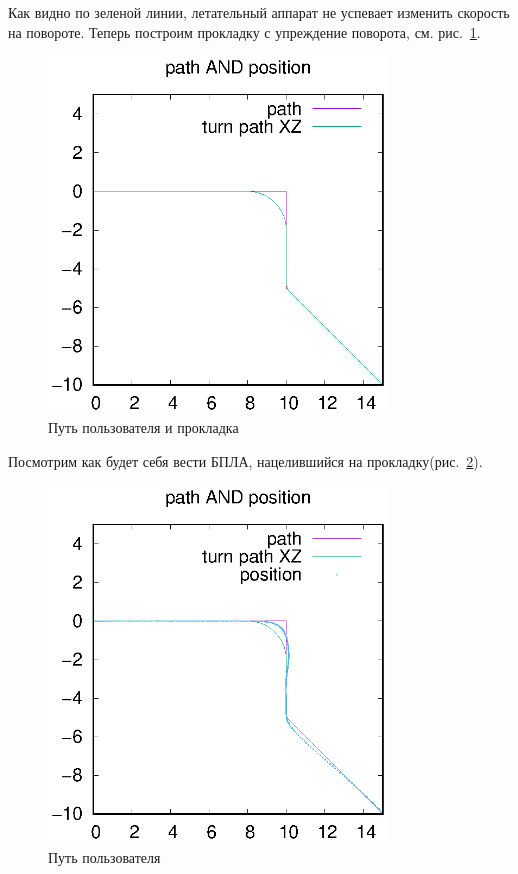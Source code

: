 \documentclass[a4paper,12pt]{article}
\newcounter{def}
\numberwithin{figure}{subsubsection}
\begin{document}
Как видно по зеленой линии, летательный аппарат не успевает изменить скорость на повороте.
Теперь построим прокладку с упреждение поворота, см. рис.~\ref{prokladka}.

\begin{figure}[p]
\centering
\includegraphics[width=90mm]{default_path_prokladka.eps}
\caption{ Путь пользователя и прокладка}\label{prokladka}
\end{figure}

Посмотрим как будет себя вести БПЛА, нацелившийся на прокладку(рис.~\ref{user_path_position}). 

\begin{figure}[p]
\centering
\includegraphics[width=90mm]{default_path_prokladka_position.eps}
\caption{ Путь пользователя}\label{user_path_position}
\end{figure}
\end{document}
